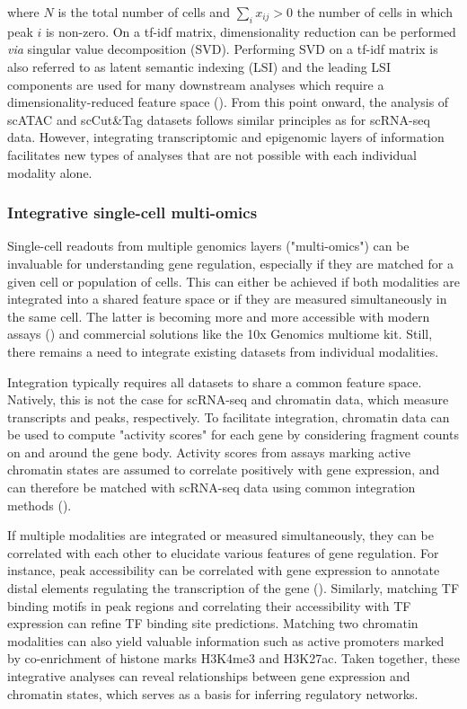 where $N$ is the total number of cells and $\sum_{i}{x_{ij} > 0}$ the number of cells in which peak $i$ is non-zero. On a tf-idf matrix, dimensionality reduction can be performed \textit{via} singular value decomposition (SVD). Performing SVD on a tf-idf matrix is also referred to as latent semantic indexing (LSI) and the leading LSI components are used for many downstream analyses which require a dimensionality-reduced feature space (\cite{stuart_comprehensive_2019}). From this point onward, the analysis of scATAC and scCut\&Tag datasets follows similar principles as for scRNA-seq data. However, integrating transcriptomic and epigenomic layers of information facilitates new types of analyses that are not possible with each individual modality alone.



\subsubsection{Integrative single-cell multi-omics}

Single-cell readouts from multiple genomics layers ("multi-omics") can be invaluable for understanding gene regulation, especially if they are matched for a given cell or population of cells. This can either be achieved if both modalities are integrated into a shared feature space or if they are measured simultaneously in the same cell. The latter is becoming more and more accessible with modern assays (\cite{ma_chromatin_2020,bartosovic_multimodal_2022}) and commercial solutions like the  10x Genomics multiome kit. Still, there remains a need to integrate existing datasets from individual modalities.

Integration typically requires all datasets to share a common feature space. Natively, this is not the case for scRNA-seq and chromatin data, which measure transcripts and peaks, respectively. To facilitate integration, chromatin data can be used to compute "activity scores" for each gene by considering fragment counts on and around the gene body. Activity scores from assays marking active chromatin states are assumed to correlate positively with gene expression, and can therefore be matched with scRNA-seq data using common integration methods (\cite{stuart_comprehensive_2019,luecken_benchmarking_2022}). 

If multiple modalities are integrated or measured simultaneously, they can be correlated with each other to elucidate various features of gene regulation. For instance, peak accessibility can be correlated with gene expression to annotate distal elements regulating the transcription of the gene (\cite{ma_chromatin_2020}). Similarly, matching TF binding motifs in peak regions and correlating their accessibility with TF expression can refine TF binding site predictions. Matching two chromatin modalities can also yield valuable information such as active promoters marked by co-enrichment of histone marks H3K4me3 and H3K27ac. Taken together, these integrative analyses can reveal relationships between gene expression and chromatin states, which serves as a basis for inferring regulatory networks.



